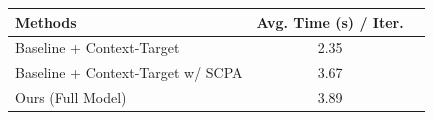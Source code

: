 
\begin{tabular}{l | c c}
\toprule
Methods & Avg. Time (s) / Iter. &  \\
\midrule
Baseline + Context-Target & 2.35 & \\
Baseline + Context-Target w/ SCPA & 3.67 &  \\
Ours (Full Model) & 3.89 &  \\
\bottomrule
\end{tabular}